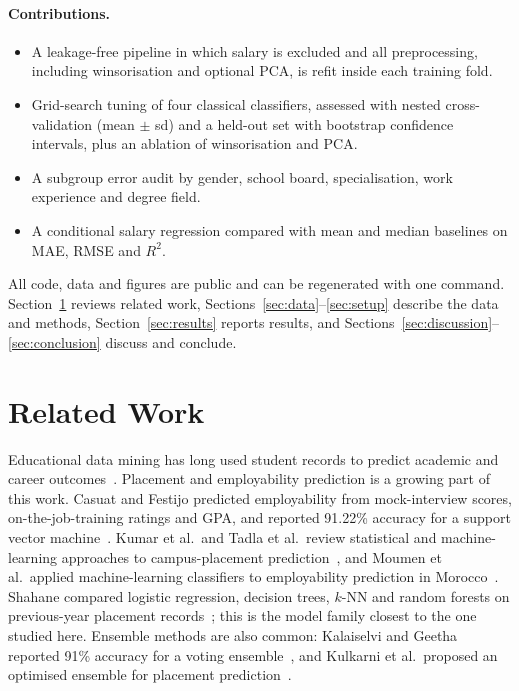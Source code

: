 \documentclass[runningheads]{llncs}
\begin{document}
\paragraph{Contributions.}
\begin{itemize}
\item A leakage-free pipeline in which salary is excluded and all preprocessing, including winsorisation and optional PCA, is refit inside each training fold.
\item Grid-search tuning of four classical classifiers, assessed with nested cross-validation (mean $\pm$ sd) and a held-out set with bootstrap confidence intervals, plus an ablation of winsorisation and PCA.
\item A subgroup error audit by gender, school board, specialisation, work experience and degree field.
\item A conditional salary regression compared with mean and median baselines on MAE, RMSE and $R^2$.
\end{itemize}
All code, data and figures are public and can be regenerated with one command. Section~\ref{sec:related} reviews related work, Sections~\ref{sec:data}--\ref{sec:setup} describe the data and methods, Section~\ref{sec:results} reports results, and Sections~\ref{sec:discussion}--\ref{sec:conclusion} discuss and conclude.

\section{Related Work}\label{sec:related}
Educational data mining has long used student records to predict academic and career outcomes~\cite{romero2010,romero2020}. Placement and employability prediction is a growing part of this work. Casuat and Festijo predicted employability from mock-interview scores, on-the-job-training ratings and GPA, and reported 91.22\% accuracy for a support vector machine~\cite{casuat}. Kumar et al.\ and Tadla et al.\ review statistical and machine-learning approaches to campus-placement prediction~\cite{kumar,tadla}, and Moumen et al.\ applied machine-learning classifiers to employability prediction in Morocco~\cite{moumen}. Shahane compared logistic regression, decision trees, $k$-NN and random forests on previous-year placement records~\cite{shahane}; this is the model family closest to the one studied here. Ensemble methods are also common: Kalaiselvi and Geetha reported 91\% accuracy for a voting ensemble~\cite{kalaiselvi}, and Kulkarni et al.\ proposed an optimised ensemble for placement prediction~\cite{kulkarni}.
\end{document}
